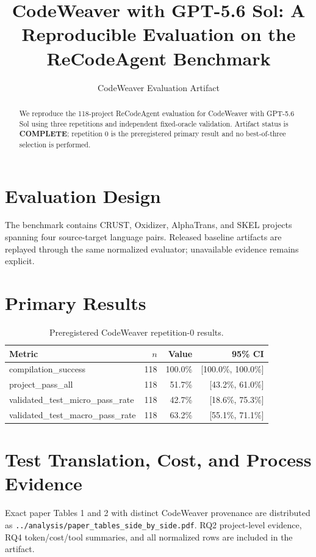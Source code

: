 \documentclass[10pt,twocolumn]{article}
\title{CodeWeaver with GPT-5.6 Sol: A Reproducible Evaluation on the ReCodeAgent Benchmark}
\author{CodeWeaver Evaluation Artifact}
\date{}
\begin{document}
\maketitle
\begin{abstract}
We reproduce the 118-project ReCodeAgent evaluation for CodeWeaver with
GPT-5.6 Sol using three repetitions and independent fixed-oracle validation.
Artifact status is \textbf{COMPLETE};
repetition 0 is the preregistered primary result and no best-of-three selection
is performed.
\end{abstract}
\section{Evaluation Design}
The benchmark contains CRUST, Oxidizer, AlphaTrans, and SKEL projects spanning
four source-target language pairs. Released baseline artifacts are replayed
through the same normalized evaluator; unavailable evidence remains explicit.
\section{Primary Results}
\begin{table}[t]
\centering
\small
\begin{tabular}{lrrr}
\toprule
Metric & $n$ & Value & 95\% CI \\
\midrule
compilation\_success & 118 & 100.0\% & [100.0\%, 100.0\%] \\
project\_pass\_all & 118 & 51.7\% & [43.2\%, 61.0\%] \\
validated\_test\_micro\_pass\_rate & 118 & 42.7\% & [18.6\%, 75.3\%] \\
validated\_test\_macro\_pass\_rate & 118 & 63.2\% & [55.1\%, 71.1\%] \\
\bottomrule
\end{tabular}
\caption{Preregistered CodeWeaver repetition-0 results.}
\end{table}
\section{Test Translation, Cost, and Process Evidence}
Exact paper Tables 1 and 2 with distinct CodeWeaver provenance are distributed
as \texttt{../analysis/paper\_tables\_side\_by\_side.pdf}. RQ2 project-level
evidence, RQ4 token/cost/tool summaries, and all normalized rows are included
in the artifact.
\end{document}

